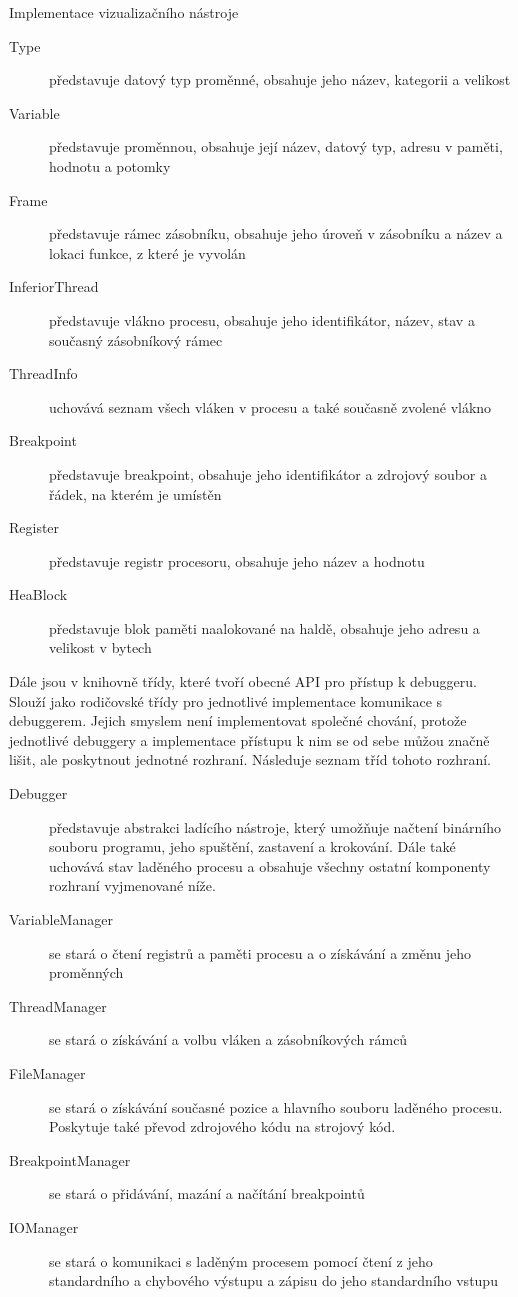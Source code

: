 \documentclass[czech,bachelor,male,python,dept460]{diploma}						%
\newcommand{\parspace}[1][]{
	\ifthenelse{\isempty{#1}}{\vspace{5mm}}{\vspace{#1}}
	\par
}
\begin{document}
\begin{section}{Implementace vizualizačního nástroje}
		\begin{description}
			\item[Type] představuje datový typ proměnné, obsahuje jeho název, kategorii a velikost
			\item[Variable] představuje proměnnou, obsahuje její název, datový typ, adresu v paměti, hodnotu a potomky
			\item[Frame] představuje rámec zásobníku, obsahuje jeho úroveň v zásobníku a název a lokaci funkce, z které je vyvolán %
			\item[InferiorThread] představuje vlákno procesu, obsahuje jeho identifikátor, název, stav a současný zásobníkový rámec
			\item[ThreadInfo] uchovává seznam všech vláken v procesu a také současně zvolené vlákno
			\item[Breakpoint] představuje breakpoint, obsahuje jeho identifikátor a zdrojový soubor a řádek, na kterém je umístěn
			\item[Register] představuje registr procesoru, obsahuje jeho název a hodnotu
			\item[HeaBlock] představuje blok paměti naalokované na haldě, obsahuje jeho adresu a velikost v bytech
		\end{description}
		
		\parspace Dále jsou v knihovně třídy, které tvoří obecné API pro přístup k debuggeru. Slouží jako rodičovské třídy pro jednotlivé implementace
		komunikace s debuggerem. Jejich smyslem není implementovat společné chování, protože jednotlivé debuggery a implementace přístupu k nim
		se od sebe můžou značně lišit, ale poskytnout jednotné rozhraní. Následuje seznam tříd tohoto rozhraní.
		
		\begin{description}
			\item[Debugger] představuje abstrakci ladícího nástroje, který umožňuje načtení binárního souboru programu, jeho spuštění, zastavení
			a krokování. Dále také uchovává stav laděného procesu a obsahuje všechny ostatní komponenty rozhraní vyjmenované níže.
			\item[VariableManager] se stará o čtení registrů a paměti procesu a o získávání a změnu jeho proměnných
			\item[ThreadManager] se stará o získávání a volbu vláken a zásobníkových rámců
			\item[FileManager] se stará o získávání současné pozice a hlavního souboru laděného procesu. Poskytuje také převod zdrojového kódu
			na strojový kód.
			\item[BreakpointManager] se stará o přidávání, mazání a načítání breakpointů
			\item[IOManager] se stará o komunikaci s laděným procesem pomocí čtení z jeho standardního a chybového výstupu a zápisu do jeho standardního vstupu
		\end{description}
		

\end{section}
\end{document}
